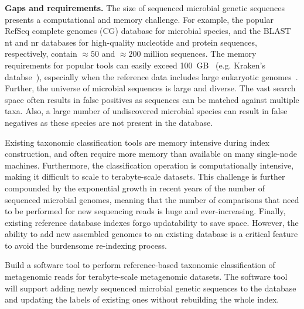 \noindent
\textbf{Gaps and requirements.}
The size of sequenced microbial genetic sequences presents a computational and memory challenge. For example, the popular RefSeq complete genomes (CG) database for microbial species, and the BLAST nt and nr databases for high-quality nucleotide and protein sequences, respectively, contain $\approx50$ and $\approx200$ million sequences. The memory requirements for popular tools can easily exceed 100~GB~\cite{simon2019benchmarking} (e.g. Kraken's databse~\cite{wood2014kraken}), especially when the reference data includes large eukaryotic genomes~\cite{meiser2017sequencing, knutson2017porcine}.
%
Further, the universe of microbial sequences is large and diverse. The vast search space often results in false positives as sequences can be matched against multiple taxa. Also, a large number of undiscovered microbial species can result in false negatives as these species are not present in the database.

Existing taxonomic classification tools are memory intensive during index construction, and often require more memory than available on many single-node machines. Furthermore, the classification operation is computationally intensive, making it difficult to scale to terabyte-scale datasets.
This challenge is further compounded by the exponential growth in recent years of the number of sequenced microbial genomes, meaning that the number of comparisons that need to be performed for new sequencing reads is huge and ever-increasing.
%
Finally, existing reference database indexes forgo updatability to save space. However, the ability to add new assembled genomes to an existing database is a critical feature to avoid the burdensome re-indexing process.


\begin{rproblem}
Build a software tool to perform reference-based taxonomic classification of metagenomic reads for terabyte-scale metagenomic datasets. The software tool will support adding newly sequenced microbial genetic sequences to the database and updating the labels of existing ones without rebuilding the whole index.
\label{rprob:taxo-meta}
\end{rproblem}



